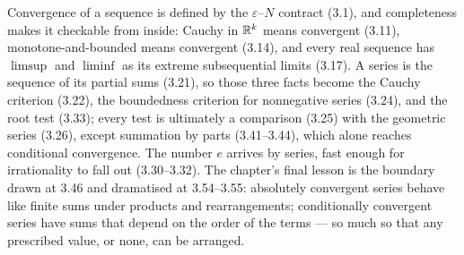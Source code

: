 \begin{recap}
Convergence of a sequence is defined by the $\varepsilon$--$N$ contract (3.1),
and completeness makes it checkable from inside: Cauchy in $\mathbb{R}^k$ means
convergent (3.11), monotone-and-bounded means convergent (3.14), and every
real sequence has $\limsup$ and $\liminf$ as its extreme subsequential limits
(3.17). A series is the sequence of its partial sums (3.21), so those three
facts become the Cauchy criterion (3.22), the boundedness criterion for
nonnegative series (3.24), and the root test (3.33); every test is ultimately
a comparison (3.25) with the geometric series (3.26), except summation by
parts (3.41--3.44), which alone reaches conditional convergence. The number
$e$ arrives by series, fast enough for irrationality to fall out (3.30--3.32).
The chapter's final lesson is the boundary drawn at 3.46 and dramatised at
3.54--3.55: absolutely convergent series behave like finite sums under
products and rearrangements; conditionally convergent series have sums that
depend on the order of the terms --- so much so that any prescribed value, or
none, can be arranged.
\end{recap}
